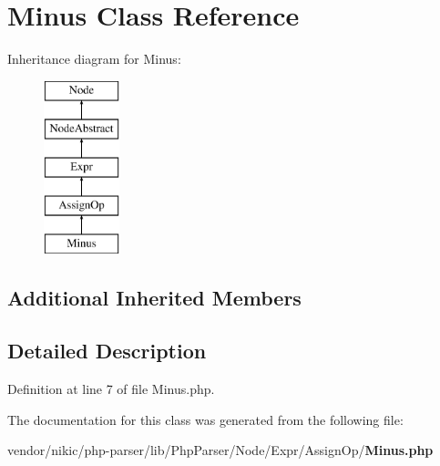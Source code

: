 \section{Minus Class Reference}
\label{class_php_parser_1_1_node_1_1_expr_1_1_assign_op_1_1_minus}
Inheritance diagram for Minus\+:\begin{figure}[H]
\begin{center}
\leavevmode
\includegraphics[height=5.000000cm]{class_php_parser_1_1_node_1_1_expr_1_1_assign_op_1_1_minus}
\end{center}
\end{figure}
\subsection*{Additional Inherited Members}


\subsection{Detailed Description}


Definition at line 7 of file Minus.\+php.



The documentation for this class was generated from the following file\+:\begin{DoxyCompactItemize}
\item 
vendor/nikic/php-\/parser/lib/\+Php\+Parser/\+Node/\+Expr/\+Assign\+Op/{\bf Minus.\+php}\end{DoxyCompactItemize}
